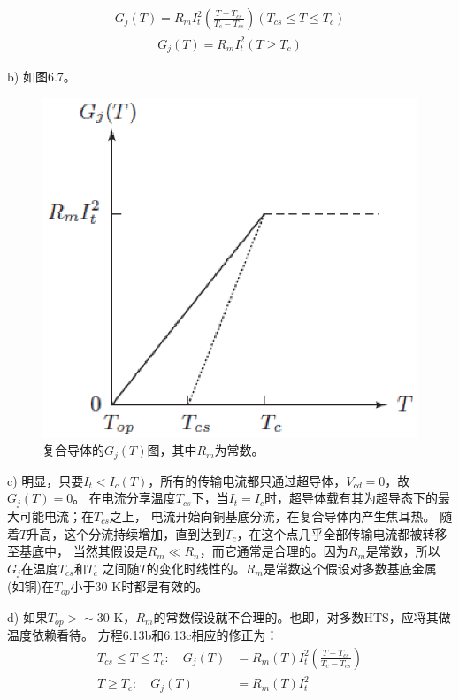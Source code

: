 \begin{align*}
	G_j(T)=R_mI_t^2(\frac{T-T_{cs}}{T_c-T_{cs}}) (T_{cs}\leq T\leq T_c) \tag{6.13b}
\end{align*}
\begin{align*}
    G_j(T)=R_mI_t^2 (T\ge T_c) \tag{6.13c}
\end{align*}


b) 如图6.7。
\begin{figure}[htbp]
	\centering
	\includegraphics[scale=0.7]{chpt6/figs/fig6.7.eps}
	\caption{复合导体的$G_j(T)$图，其中$R_m$为常数。}
\end{figure}

c) 明显，只要$I_t<I_c(T)$，所有的传输电流都只通过超导体，$V_{cd}=0$，故$G_j(T)=0$。
在电流分享温度$T_{cs}$下，当$I_t=I_c$时，超导体载有其为超导态下的最大可能电流；在$T_{cs}$之上，
电流开始向铜基底分流，在复合导体内产生焦耳热。
随着$T$升高，这个分流持续增加，直到达到$T_c$，在这个点几乎全部传输电流都被转移至基底中，
当然其假设是$R_m\ll R_n$，而它通常是合理的。因为$R_m$是常数，所以$G_j$在温度$T_{cs}$和$T_c$
之间随$T$的变化时线性的。$R_m$是常数这个假设对多数基底金属(如铜)在$T_{op}$小于30 K时都是有效的。

d) 如果$T_{op}>\sim 30$ K，$R_m$的常数假设就不合理的。也即，对多数HTS，应将其做温度依赖看待。
方程6.13b和6.13c相应的修正为：
\begin{subequations}
	\begin{align}
	T_{cs}\leq T\leq T_c:\quad G_j(T)&=R_m(T)I_t^2(\frac{T-T_{cs}}{T_c-T_{cs}})\\
	T\ge T_c:\quad G_j(T)&=R_m(T)I_t^2
	\end{align}
\end{subequations}


